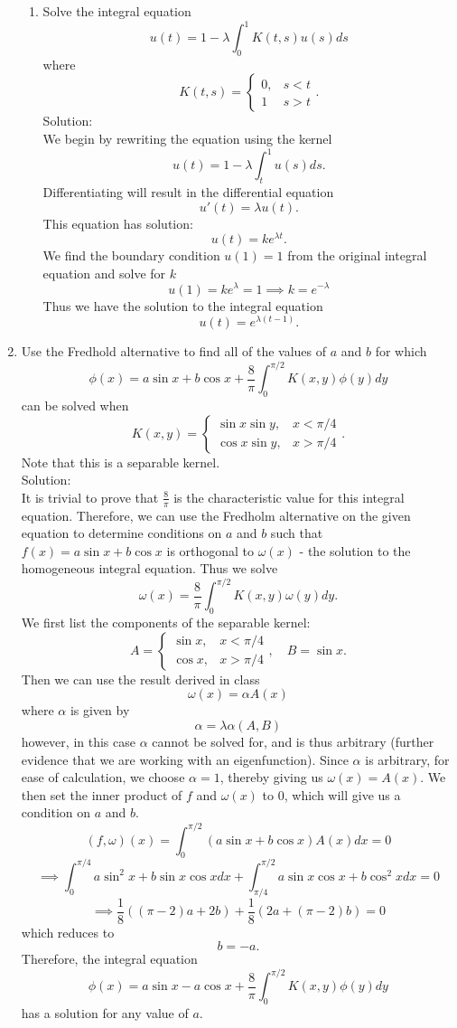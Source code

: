 \documentclass[12pt]{article}
\numberwithin{equation}{section}
\begin{document}
\begin{enumerate}
\begin{enumerate}
    \item Solve the integral equation
    $$u(t)=1-\lambda\int_0^1 K(t,s)u(s)ds$$
    where
    $$K(t,s)=\left\{\begin{array}{cc}0,&s< t\\1&s> t\end{array}\right..$$
    Solution:\\

    We begin by rewriting the equation using the kernel
    $$u(t)=1-\lambda\int_t^1u(s)ds.$$
    Differentiating will result in the differential equation
    $$u'(t)=\lambda u(t).$$
    This equation has solution:
    $$u(t)=ke^{\lambda t}.$$
    We find the boundary condition $u(1)=1$ from the original integral equation and solve for $k$
    $$u(1)=ke^\lambda=1\implies k=e^{-\lambda}$$
    Thus we have the solution to the integral equation
    $$u(t)=e^{\lambda(t-1)}.$$

    \end{enumerate}
    \item Use the Fredhold alternative to find all of the values of $a$ and $b$ for which
    $$\phi(x)=a\sin x+b\cos x+\frac{8}{\pi}\int_0^{\pi/2}K(x,y)\phi(y)dy$$
    can be solved when
    $$K(x,y)=\left\{\begin{array}{cc} \sin x\sin y,&x<\pi/4\\ \cos x\sin y,& x>\pi/4\end{array}\right..$$
    Note that this is a separable kernel.\\

    Solution:\\

    It is trivial to prove that $\frac{8}{\pi}$ is the characteristic value for this integral equation. Therefore, we can use the Fredholm alternative on the given equation to determine conditions on $a$ and $b$ such that $f(x)=a\sin x+b\cos x$ is orthogonal to $\omega(x)$ - the solution to the homogeneous integral equation. Thus we solve
    $$\omega(x)=\frac{8}{\pi}\int_0^{\pi/2}K(x,y)\omega(y)dy.$$
    We first list the components of the separable kernel:
    $$A=\left\{\begin{array}{cc}\sin x,&x<\pi/4\\ \cos x,&x>\pi/4\end{array}\right.,\quad B=\sin x.$$
    Then we can use the result derived in class
    $$\omega(x)=\alpha A(x)$$
    where $\alpha$ is given by
    $$\alpha=\lambda \alpha (A,B)$$
    however, in this case $\alpha$ cannot be solved for, and is thus arbitrary (further evidence that we are working with an eigenfunction). Since $\alpha$ is arbitrary, for ease of calculation, we choose $\alpha=1$, thereby giving us $\omega(x)=A(x).$ We then set the inner product of $f$ and $\omega(x)$ to 0, which will give us a condition on $a$ and $b$.
    $$(f,\omega)(x)=\int_0^{\pi/2}(a\sin x+b\cos x)A(x)dx=0$$
    $$\implies \int_0^{\pi/4}a\sin^2 x+b\sin x\cos xdx+\int_{\pi/4}^{\pi/2}a\sin x\cos x+b\cos^2 xdx=0$$
    $$\implies \frac{1}{8}((\pi-2)a+2b)+\frac{1}{8}(2a+(\pi-2)b)=0$$
    which reduces to
    $$b=-a.$$
    Therefore, the integral equation
    $$\phi(x)=a\sin x-a\cos x+\frac{8}{\pi}\int_0^{\pi/2}K(x,y)\phi(y)dy$$
    has a solution for any value of $a$.


\end{enumerate}
\end{document}
